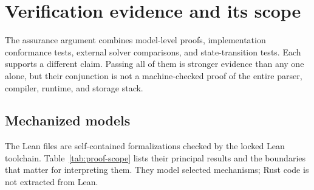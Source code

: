 \section{Verification evidence and its scope}
\label{sec:verification}

The assurance argument combines model-level proofs, implementation conformance
tests, external solver comparisons, and state-transition tests. Each supports
a different claim. Passing all of them is stronger evidence than any one alone,
but their conjunction is not a machine-checked proof of the entire parser,
compiler, runtime, and storage stack.

\subsection{Mechanized models}

The Lean files are self-contained formalizations checked by the locked Lean
toolchain. Table~\ref{tab:proof-scope} lists their principal results and the
boundaries that matter for interpreting them. They model selected mechanisms;
Rust code is not extracted from Lean.


